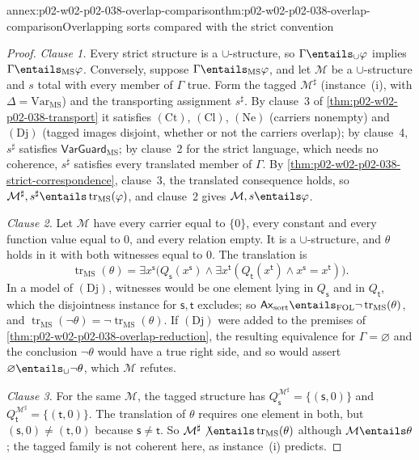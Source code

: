 \begin{annexitem}{annex:p02-w02-p02-038-overlap-comparison}{thm:p02-w02-p02-038-overlap-comparison}{Overlapping sorts compared with the strict convention}
\begin{proof}
\emph{Clause 1.}  Every strict structure is a \(\cup\)-structure, so
\(\Gamma\entails_{\cup}\varphi\) implies \(\Gamma\entails_{\mathrm{MS}}\varphi\).
Conversely, suppose \(\Gamma\entails_{\mathrm{MS}}\varphi\), and let
\(\mathcal M\) be a \(\cup\)-structure and \(s\) total with every member of
\(\Gamma\) true.  Form the tagged \(\mathcal M^{\sharp}\) (instance~(i), with
\(\Delta=\mathrm{Var}_{\mathrm{MS}}\)) and the transporting assignment
\(s^{\sharp}\).  By clause~3 of \cref{thm:p02-w02-p02-038-transport} it
satisfies \((\mathrm{Ct})\), \((\mathrm{Cl})\), \((\mathrm{Ne})\) (carriers
nonempty) and \((\mathrm{Dj})\) (tagged images disjoint, whether or not the
carriers overlap); by clause~4, \(s^{\sharp}\) satisfies
\(\mathsf{VarGuard}_{\mathrm{MS}}\); by clause~2 for the strict language,
which needs no coherence, \(s^{\sharp}\) satisfies every translated member
of \(\Gamma\).  By \cref{thm:p02-w02-p02-038-strict-correspondence},
clause~3, the translated consequence holds, so
\(\mathcal M^{\sharp},s^{\sharp}\entails\operatorname{tr}_{\mathrm{MS}}(\varphi)\),
and clause~2 gives \(\mathcal M,s\entails\varphi\).

\emph{Clause 2.}  Let \(\mathcal M\) have every carrier equal to \(\{0\}\),
every constant and every function value equal to \(0\), and every relation
empty.  It is a \(\cup\)-structure, and \(\theta\) holds in it with both
witnesses equal to \(0\).  The translation is
\[
 \operatorname{tr}_{\mathrm{MS}}(\theta)=
 \exists x^{\mathsf s}\bigl(Q_{\mathsf s}(x^{\mathsf s})\land
 \exists x^{\mathsf t}(Q_{\mathsf t}(x^{\mathsf t})\land
 x^{\mathsf s}=x^{\mathsf t})\bigr).
\]
In a model of \((\mathrm{Dj})\), witnesses would be one element lying in
\(Q_{\mathsf s}\) and in \(Q_{\mathsf t}\), which the disjointness instance
for \(\mathsf s,\mathsf t\) excludes; so
\(\mathsf{Ax}_{\mathrm{sort}}\entails_{\mathrm{FOL}}
\neg\operatorname{tr}_{\mathrm{MS}}(\theta)\), and
\(\operatorname{tr}_{\mathrm{MS}}(\neg\theta)=
\neg\operatorname{tr}_{\mathrm{MS}}(\theta)\).  If \((\mathrm{Dj})\) were
added to the premises of \cref{thm:p02-w02-p02-038-overlap-reduction}, the
resulting equivalence for \(\Gamma=\varnothing\) and the conclusion
\(\neg\theta\) would have a true right side, and so would assert
\(\varnothing\entails_{\cup}\neg\theta\), which \(\mathcal M\) refutes.

\emph{Clause 3.}  For the same \(\mathcal M\), the tagged structure has
\(Q_{\mathsf s}^{\mathcal M^{\sharp}}=\{(\mathsf s,0)\}\) and
\(Q_{\mathsf t}^{\mathcal M^{\sharp}}=\{(\mathsf t,0)\}\).  The translation of
\(\theta\) requires one element in both, but \((\mathsf s,0)\ne(\mathsf t,0)\)
because \(\mathsf s\ne\mathsf t\).  So
\(\mathcal M^{\sharp}\not\entails\operatorname{tr}_{\mathrm{MS}}(\theta)\)
although \(\mathcal M\entails\theta\); the tagged family is not coherent here,
as instance~(i) predicts.
\end{proof}
\end{annexitem}
